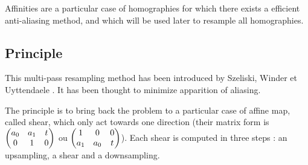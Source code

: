 

Affinities are a particular case of homographies for which there exists a efficient anti-aliasing method, and which will be used later to resample all homographies.

\subsection{Principle}
	
	This multi-pass resampling method has been introduced by Szeliski, Winder et Uyttendaele \cite{szeliski2010high}. It has been thought to minimize apparition of aliasing.

	
	The principle is to bring back the problem to a particular case of affine map, called shear, which only act towards one direction (their matrix form is $\begin{pmatrix} a_0 & a_1 & t\\ 0 & 1 & 0 \end{pmatrix}$ ou $\begin{pmatrix} 1 & 0 & 0\\ a_1 & a_0 & t \end{pmatrix}$). Each shear is computed in three steps : an upsampling, a shear and a downsampling.
	
	
